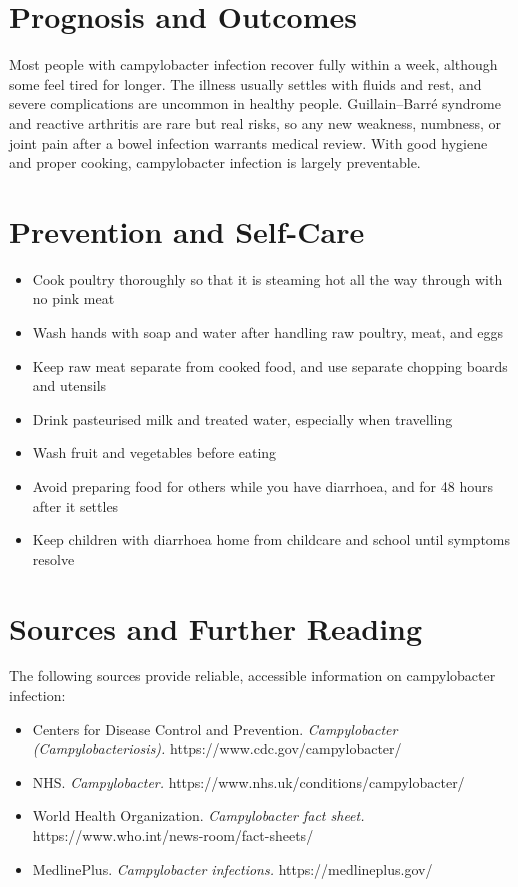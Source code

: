 \section*{Prognosis and Outcomes}
Most people with campylobacter infection recover fully within a week, although some feel tired for longer. The illness usually settles with fluids and rest, and severe complications are uncommon in healthy people. Guillain--Barré syndrome and reactive arthritis are rare but real risks, so any new weakness, numbness, or joint pain after a bowel infection warrants medical review. With good hygiene and proper cooking, campylobacter infection is largely preventable.

\section*{Prevention and Self-Care}
\begin{itemize}
    \item Cook poultry thoroughly so that it is steaming hot all the way through with no pink meat
    \item Wash hands with soap and water after handling raw poultry, meat, and eggs
    \item Keep raw meat separate from cooked food, and use separate chopping boards and utensils
    \item Drink pasteurised milk and treated water, especially when travelling
    \item Wash fruit and vegetables before eating
    \item Avoid preparing food for others while you have diarrhoea, and for 48 hours after it settles
    \item Keep children with diarrhoea home from childcare and school until symptoms resolve
\end{itemize}

\section*{Sources and Further Reading}
The following sources provide reliable, accessible information on campylobacter infection:
\begin{itemize}
    \item Centers for Disease Control and Prevention. \textit{Campylobacter (Campylobacteriosis).} https://www.cdc.gov/campylobacter/
    \item NHS. \textit{Campylobacter.} https://www.nhs.uk/conditions/campylobacter/
    \item World Health Organization. \textit{Campylobacter fact sheet.} https://www.who.int/news-room/fact-sheets/
    \item MedlinePlus. \textit{Campylobacter infections.} https://medlineplus.gov/
\end{itemize}
